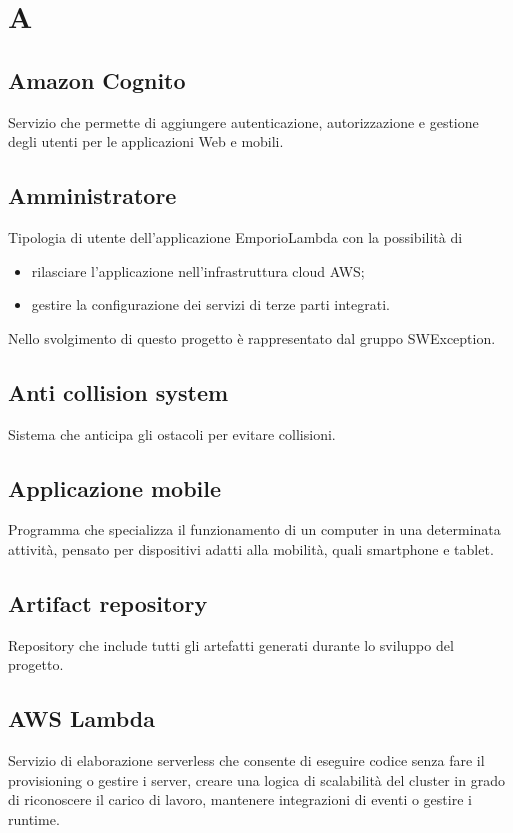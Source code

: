 \section{A}
\subsection*{Amazon Cognito}
Servizio che permette di aggiungere autenticazione, autorizzazione e gestione degli utenti per le applicazioni Web e mobili.

\subsection*{Amministratore}
Tipologia di utente dell'applicazione EmporioLambda con la possibilità di
\begin{itemize}
    \item rilasciare l'applicazione nell'infrastruttura cloud AWS;
    \item gestire la configurazione dei servizi di terze parti integrati.
\end{itemize}
Nello svolgimento di questo progetto è rappresentato dal gruppo SWException.

\subsection*{Anti collision system}
Sistema che anticipa gli ostacoli per evitare collisioni.

\subsection*{Applicazione mobile}
Programma che specializza il funzionamento di un computer in una determinata attività, pensato per dispositivi adatti alla mobilità, quali smartphone e tablet.

\subsection*{Artifact repository}
Repository che include tutti gli artefatti generati durante lo sviluppo del progetto.

\subsection*{AWS Lambda}
Servizio di elaborazione serverless che consente di eseguire codice senza fare il provisioning o gestire i server, creare una logica di scalabilità del cluster in grado di riconoscere il carico di lavoro, mantenere integrazioni di eventi o gestire i runtime.

